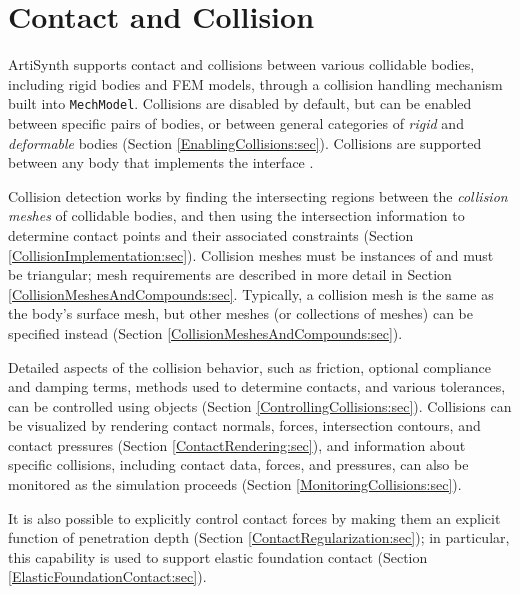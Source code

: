 \ifdefined\maindoc\else
\def\doctitle{Contact and collisions}

\mainmatter
\fi

\chapter{Contact and Collision}
\label{ContactAndCollision:sec}
ArtiSynth supports contact and collisions between various collidable
bodies, including rigid bodies and FEM models, through a collision
handling mechanism built into {\tt MechModel}. Collisions are disabled
by default, but can be enabled between specific pairs of bodies, or
between general categories of {\it rigid} and {\it deformable} bodies
(Section \ref{EnablingCollisions:sec}). Collisions are supported
between any body that implements the interface
.

Collision detection works by finding the intersecting regions between
the {\it collision meshes} of collidable bodies, and then using the
intersection information to determine contact points and their
associated constraints (Section \ref{CollisionImplementation:sec}).
Collision meshes must be instances of
 and must be triangular;
mesh requirements are described in more detail in Section
\ref{CollisionMeshesAndCompounds:sec}. Typically, a collision mesh
is the same as the body's surface mesh, but other meshes (or
collections of meshes) can be specified instead
(Section \ref{CollisionMeshesAndCompounds:sec}).

Detailed aspects of the collision behavior, such as friction, optional
compliance and damping terms, methods used to determine contacts, and
various tolerances, can be controlled using
 objects
(Section \ref{ControllingCollisions:sec}). Collisions can be
visualized by rendering contact normals, forces, intersection
contours, and contact pressures (Section \ref{ContactRendering:sec}),
and information about specific collisions, including contact data,
forces, and pressures, can also be monitored as the simulation
proceeds (Section \ref{MonitoringCollisions:sec}).  

It is also possible to explicitly control contact forces by making
them an explicit function of penetration depth (Section
\ref{ContactRegularization:sec}); in particular, this capability is
used to support elastic foundation contact (Section
\ref{ElasticFoundationContact:sec}).

